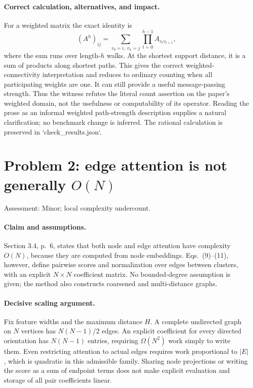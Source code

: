 \documentclass[10pt]{article}
\begin{document}
\paragraph*{Correct calculation, alternatives, and impact.}\mbox{}\par
For a weighted matrix the exact identity is \[(A^h)_{ij}=\sum_{v_0=i,\ v_h=j}\prod_{t=0}^{h-1}A_{v_t v_{t+1}},\] where the sum runs over length-\(h\) walks. At the shortest support distance, it is a sum of products along shortest paths. This gives the correct weighted-connectivity interpretation and reduces to ordinary counting when all participating weights are one. It can still provide a useful message-passing strength. Thus the witness refutes the literal count assertion on the paper’s weighted domain, not the usefulness or computability of its operator. Reading the prose as an informal weighted path-strength description supplies a natural clarification; no benchmark change is inferred. The rational calculation is preserved in `check\_results.json`.\par
\section*{Problem 2: edge attention is not generally \(O(N)\)}
Assessment: Minor; local complexity undercount.\par
\paragraph*{Claim and assumptions.}\mbox{}\par
Section 3.4, p. 6, states that both node and edge attention have complexity \(O(N)\), because they are computed from node embeddings. Eqs. (9)–(11), however, define pairwise scores and normalization over edges between clusters, with an explicit \(N\times N\) coefficient matrix. No bounded-degree assumption is given; the method also constructs coarsened and multi-distance graphs.\par
\paragraph*{Decisive scaling argument.}\mbox{}\par
Fix feature widths and the maximum distance \(H\). A complete undirected graph on \(N\) vertices has \(N(N-1)/2\) edges. An explicit coefficient for every directed orientation has \(N(N-1)\) entries, requiring \(\Omega(N^2)\) work simply to write them. Even restricting attention to actual edges requires work proportional to \(|E|\), which is quadratic in this admissible family. Sharing node projections or writing the score as a sum of endpoint terms does not make explicit evaluation and storage of all pair coefficients linear.\par
\end{document}
